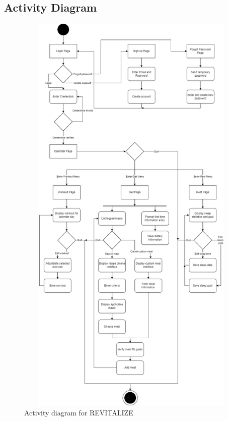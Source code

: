 \documentclass[12pt,letterpaper]{article}
\begin{document}
\subsection{Activity Diagram}
\begin{figure}[H]
\centering
\includegraphics[width=15cm, height=20cm]{4G06SRSActivityDiagram.png}
\caption{Activity diagram for REVITALIZE}
\end{figure}
\end{document}
